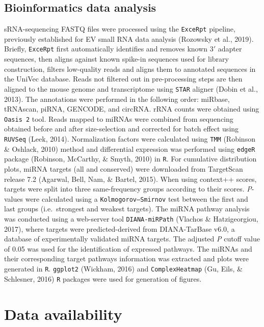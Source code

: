 \documentclass[12pt,twoside]{reedthesis}
\begin{document}
\hypertarget{bioinformatics-data-analysis}{%
\subsection{Bioinformatics data analysis}\label{bioinformatics-data-analysis}}

sRNA-sequencing FASTQ files were processed using the \texttt{ExceRpt} pipeline, previously established for EV small RNA data analysis (Rozowsky et al., 2019). Briefly, \texttt{ExceRpt} first automatically identifies and removes known 3\('\) adapter sequences, then aligns against known spike-in sequences used for library construction, filters low-quality reads and aligns them to annotated sequences in the UniVec database. Reads not filtered out in pre-processing steps are then aligned to the mouse genome and transcriptome using \texttt{STAR} aligner (Dobin et al., 2013). The annotations were performed in the following order: miRbase, tRNAscan, piRNA, GENCODE, and circRNA. rRNA counts were obtained using \texttt{Oasis\ 2} tool. Reads mapped to miRNAs were combined from sequencing obtained before and after size-selection and corrected for batch effect using \texttt{RUVSeq} (Leek, 2014). Normalization factors were calculated using \texttt{TMM} (Robinson \& Oshlack, 2010) method and differential expression was performed using \texttt{edgeR} package (Robinson, McCarthy, \& Smyth, 2010) in \texttt{R}. For cumulative distribution plots, miRNA targets (all and conserved) were downloaded from TargetScan release 7.2 (Agarwal, Bell, Nam, \& Bartel, 2015). When using context++ scores, targets were split into three same-frequency groups according to their scores. \textit{P}-values were calculated using a \texttt{Kolmogorov–Smirnov} test between the first and last groups (i.e.~strongest and weakest targets). The miRNA pathway analysis was conducted using a web-server tool \texttt{DIANA-miRPath} (Vlachos \& Hatzigeorgiou, 2017), where targets were predicted-derived from DIANA-TarBase v6.0, a database of experimentally validated miRNA targets. The adjusted \textit{P} cutoff value of 0.05 was used for the identification of expressed pathways. The miRNAs and their corresponding target pathways information was extracted and plots were generated in \texttt{R}. \texttt{ggplot2} (Wickham, 2016) and \texttt{ComplexHeatmap} (Gu, Eils, \& Schlesner, 2016) \texttt{R} packages were used for generation of figures.

\hypertarget{data-availability}{%
\section{Data availability}\label{data-availability}}
\end{document}
